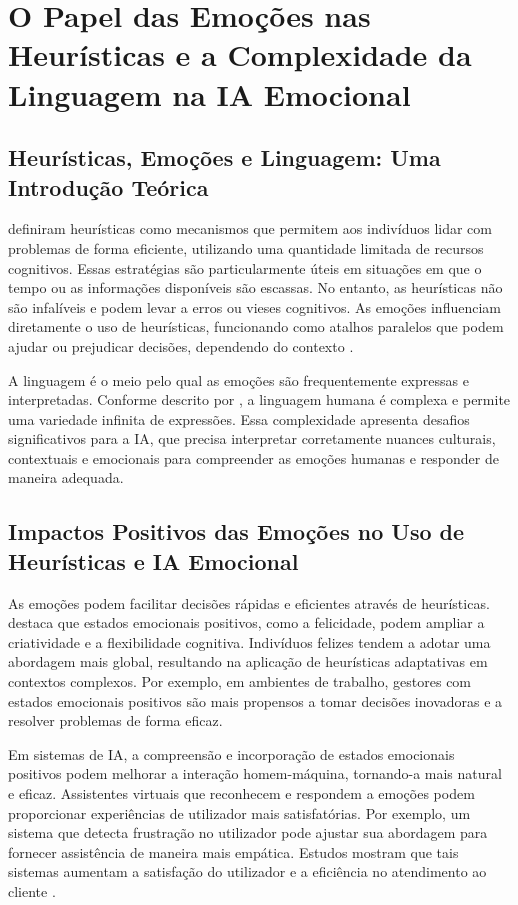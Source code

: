 \documentclass[a4paper,12pt]{report}
\begin{document}
	\section{O Papel das Emoções nas Heurísticas e a Complexidade da Linguagem na IA Emocional}
	
	\subsection{Heurísticas, Emoções e Linguagem: Uma Introdução Teórica}
	
	\textcite{kahneman1974} definiram heurísticas como mecanismos que permitem aos indivíduos lidar com problemas de forma eficiente, utilizando uma quantidade limitada de recursos cognitivos. Essas estratégias são particularmente úteis em situações em que o tempo ou as informações disponíveis são escassas. No entanto, as heurísticas não são infalíveis e podem levar a erros ou vieses cognitivos. As emoções influenciam diretamente o uso de heurísticas, funcionando como atalhos paralelos que podem ajudar ou prejudicar decisões, dependendo do contexto \parencite{slovic2007}.
	
	A linguagem é o meio pelo qual as emoções são frequentemente expressas e interpretadas. Conforme descrito por \textcite{chomsky1965}, a linguagem humana é complexa e permite uma variedade infinita de expressões. Essa complexidade apresenta desafios significativos para a IA, que precisa interpretar corretamente nuances culturais, contextuais e emocionais para compreender as emoções humanas e responder de maneira adequada.
	
	\subsection{Impactos Positivos das Emoções no Uso de Heurísticas e IA Emocional}
	
	As emoções podem facilitar decisões rápidas e eficientes através de heurísticas. \textcite{isen2001} destaca que estados emocionais positivos, como a felicidade, podem ampliar a criatividade e a flexibilidade cognitiva. Indivíduos felizes tendem a adotar uma abordagem mais global, resultando na aplicação de heurísticas adaptativas em contextos complexos. Por exemplo, em ambientes de trabalho, gestores com estados emocionais positivos são mais propensos a tomar decisões inovadoras e a resolver problemas de forma eficaz.
	
	Em sistemas de IA, a compreensão e incorporação de estados emocionais positivos podem melhorar a interação homem-máquina, tornando-a mais natural e eficaz. Assistentes virtuais que reconhecem e respondem a emoções podem proporcionar experiências de utilizador mais satisfatórias. Por exemplo, um sistema que detecta frustração no utilizador pode ajustar sua abordagem para fornecer assistência de maneira mais empática. Estudos mostram que tais sistemas aumentam a satisfação do utilizador e a eficiência no atendimento ao cliente \parencite{picard1997}.
	
\end{document}
